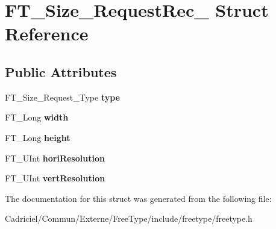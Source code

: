 \hypertarget{struct_f_t___size___request_rec__}{}\section{F\+T\+\_\+\+Size\+\_\+\+Request\+Rec\+\_\+ Struct Reference}
\label{struct_f_t___size___request_rec__}
\subsection*{Public Attributes}
\begin{DoxyCompactItemize}
\item 
F\+T\+\_\+\+Size\+\_\+\+Request\+\_\+\+Type {\bfseries type}\hypertarget{struct_f_t___size___request_rec___a7644b04dd2b26c0698df558775320494}{}\label{struct_f_t___size___request_rec___a7644b04dd2b26c0698df558775320494}

\item 
F\+T\+\_\+\+Long {\bfseries width}\hypertarget{struct_f_t___size___request_rec___a7b044d36af318b053d5e3939eb0d5039}{}\label{struct_f_t___size___request_rec___a7b044d36af318b053d5e3939eb0d5039}

\item 
F\+T\+\_\+\+Long {\bfseries height}\hypertarget{struct_f_t___size___request_rec___af8142450d8d032e1870d758cdcfa51a9}{}\label{struct_f_t___size___request_rec___af8142450d8d032e1870d758cdcfa51a9}

\item 
F\+T\+\_\+\+U\+Int {\bfseries hori\+Resolution}\hypertarget{struct_f_t___size___request_rec___a3a85704d13561d9db53aa60f7805ec73}{}\label{struct_f_t___size___request_rec___a3a85704d13561d9db53aa60f7805ec73}

\item 
F\+T\+\_\+\+U\+Int {\bfseries vert\+Resolution}\hypertarget{struct_f_t___size___request_rec___a86601c38d91064b6efe256a9e99c56f4}{}\label{struct_f_t___size___request_rec___a86601c38d91064b6efe256a9e99c56f4}

\end{DoxyCompactItemize}


The documentation for this struct was generated from the following file\+:\begin{DoxyCompactItemize}
\item 
Cadriciel/\+Commun/\+Externe/\+Free\+Type/include/freetype/freetype.\+h\end{DoxyCompactItemize}
